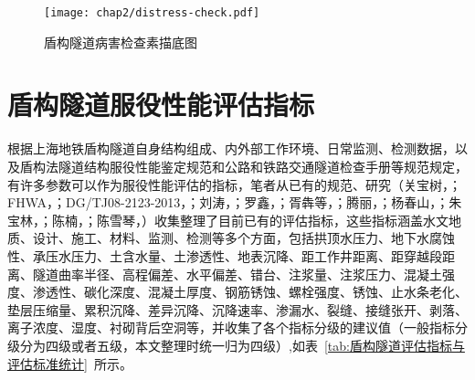 \begin{figure}[htbp]
    \centering
    \texttt{[image: chap2/distress-check.pdf]}
    \caption{盾构隧道病害检查素描底图}
    \label{fig:盾构隧道病害检查素描底图}
\end{figure}

\section{盾构隧道服役性能评估指标}

根据上海地铁盾构隧道自身结构组成、内外部工作环境、日常监测、检测数据，以及盾构法隧道结构服役性能鉴定规范和公路和铁路交通隧道检查手册等规范规定，有许多参数可以作为服役性能评估的指标，笔者从已有的规范、研究（关宝树，\citeyear{关宝树1993日本铁路隧道维修养护管理技术的现状}；FHWA，\citeyear{FHWA2005Highway}；DG/TJ08-2123-2013，\citeyear{DGTJ0821232013}；刘涛，\citeyear{刘涛2008既有盾构隧道结构性能评价研究}；罗鑫，\citeyear{罗鑫2008公路隧道健康状态评估方法及系统研究}；胥犇等，\citeyear{胥犇2010盾构隧道结构病害状态综合评价方法研究}；腾丽，\citeyear{滕丽2012基于土体力学特性的盾构隧道施工风险监控系统研究}；杨春山，\citeyear{杨春山2012运营地铁盾构隧道衬砌结构安全评估体系研究}；朱宝林，\citeyear{朱宝林2014运营地铁盾构隧道状态评估及预测方法研究}；陈楠，\citeyear{陈楠2017考虑发展趋势与指标关联的隧道结构健康评估方法研究}；陈雪琴，\citeyear{陈雪琴2017交通基础设施服役性能评估和预测以及养护时机优化分析}）收集整理了目前已有的评估指标，这些指标涵盖水文地质、设计、施工、材料、监测、检测等多个方面，包括拱顶水压力、地下水腐蚀性、承压水压力、土含水量、土渗透性、地表沉降、距工作井距离、距穿越段距离、隧道曲率半径、高程偏差、水平偏差、错台、注浆量、注浆压力、混凝土强度、渗透性、碳化深度、混凝土厚度、钢筋锈蚀、螺栓强度、锈蚀、止水条老化、垫层压缩量、累积沉降、差异沉降、沉降速率、渗漏水、裂缝、接缝张开、剥落、离子浓度、湿度、衬砌背后空洞等，并收集了各个指标分级的建议值（一般指标分级分为四级或者五级，本文整理时统一归为四级）,如表~\ref{tab:盾构隧道评估指标与评估标准统计}~所示。

